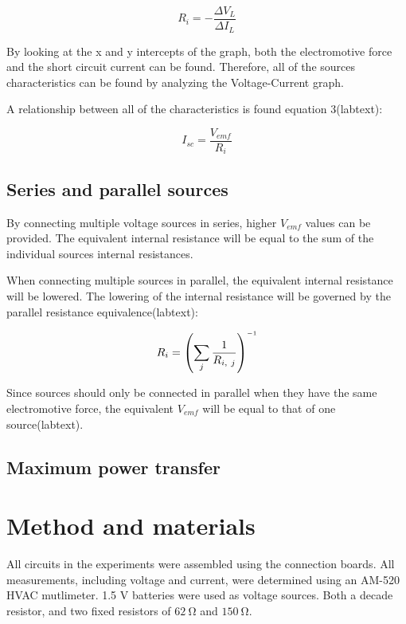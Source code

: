 \documentclass[a4paper]{article}
\newcommand{\inv}{^{\raisebox{.2ex}{$\scriptscriptstyle-1$}}}
\newcommand{\unit}[1]{~\mathrm{#1}}
\begin{document}
\begin{equation}
    R_i = -\frac{\Delta V_L}{\Delta I_L}
\end{equation}

By looking at the x and y intercepts of the graph, both the electromotive force
and the short circuit current can be found. Therefore, all of the sources
characteristics can be found by analyzing the Voltage-Current graph.

A relationship between all of the characteristics is found equation 3(labtext):

\begin{equation}
    I_{sc} = \frac{V_{emf}}{R_i}
\end{equation}

\subsection{Series and parallel sources}
By connecting multiple voltage sources in series, higher $V_{emf}$ values can be
provided. The equivalent internal resistance will be equal to the sum of the
individual sources internal resistances.

When connecting multiple sources in parallel, the equivalent internal resistance
will be lowered. The lowering of the internal resistance will be governed by the
parallel resistance equivalence(labtext):

\begin{equation}
    R_i = \left( \sum_{j} \frac{1}{R_{i,~j}}\right) \inv
\end{equation}

Since sources should only be connected in parallel when they have the same
electromotive force, the equivalent $V_{emf}$ will be equal to that of one
source(labtext).

\subsection{Maximum power transfer}

\section{Method and materials}
All circuits in the experiments were assembled using the connection boards. All
measurements, including voltage and current, were determined using an AM-520
HVAC mutlimeter. 1.5 V batteries were used as voltage sources. Both a decade
resistor, and two fixed resistors of $62\unit{\Omega}$ and $150\unit{\Omega}$.
\end{document}
